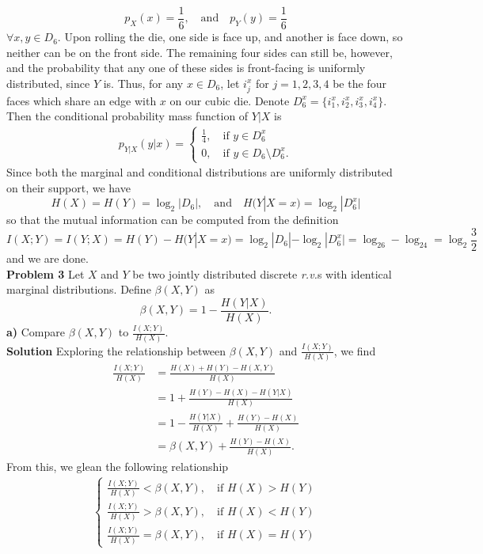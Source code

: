 \documentclass[11pt, letterpaper]{article}
\begin{document}
\[p_X(x)=\frac{1}{6},\quad\text{and}\quad p_Y(y)=\frac{1}{6}\]
$\forall x,y\in D_6$. Upon rolling the die, one side is face up, and another is face down, so neither can be on the front side. The remaining four sides can still be, however, and
the probability that any one of these sides is front-facing is uniformly distributed, since $Y$ is. Thus, for any $x\in D_6$, let $i_j^x$ for $j=1,2,3,4$ be the four faces which share an edge with
$x$ on our cubic die. Denote $D_6^x=\{i^x_1,i^x_2,i^x_3,i^x_4\}$. Then the conditional probability mass function of $Y|X$ is
\begin{align*}
    p_{Y|X}(y|x)=\begin{cases}
        \frac{1}{4},\quad\text{if $y\in D_6^x$}\\
        0,\quad\text{if $y\in D_6\setminus D_6^x$}.
    \end{cases}
\end{align*}
Since both the marginal and conditional distributions are uniformly distributed on their support, we have
\[H(X)=H(Y)=\log_2|D_6|,\quad\text{and}\quad H(Y|X=x)=\log_2|D_6^x|\tag{Lemma 2.6}\]
so that the mutual information can be computed from the definition
\[I(X;Y)=I(Y;X)=H(Y)-H(Y|X=x)=\log_2|D_6|-\log_2|D_6^x|=\log_26-\log_24=\log_2\frac{3}{2}\]
and we are done.\\[10pt]
{\bf Problem 3} Let $X$ and $Y$ be two jointly distributed discrete {\it r.v.}s with identical marginal distributions.
Define $\beta(X,Y)$ as
\[\beta(X,Y)=1-\frac{H(Y|X)}{H(X)}.\]
{\bf a)} Compare $\beta(X,Y)$ to $\frac{I(X;Y)}{H(X)}$.\\[10pt]
{\bf Solution} Exploring the relationship between $\beta(X,Y)$ and $\frac{I(X;Y)}{H(X)}$, we find
\begin{align*}
    \frac{I(X;Y)}{H(X)}&=\frac{H(X)+H(Y)-H(X,Y)}{H(X)}\\
    &=1+\frac{H(Y)-H(X)-H(Y|X)}{H(X)}\tag{expanding $H(X,Y)=H(X)+H(Y|X)$}\\
    &=1-\frac{H(Y|X)}{H(X)}+\frac{H(Y)-H(X)}{H(X)}\\
    &=\beta(X,Y)+\frac{H(Y)-H(X)}{H(X)}.\tag{1}
\end{align*}
From this, we glean the following relationship
\begin{align*}
    \begin{cases}
        \frac{I(X;Y)}{H(X)}<\beta(X,Y),\quad\text{if $H(X)>H(Y)$}\\[5pt]
        \frac{I(X;Y)}{H(X)}>\beta(X,Y),\quad\text{if $H(X)<H(Y)$}\\[5pt]
        \frac{I(X;Y)}{H(X)}=\beta(X,Y),\quad\text{if $H(X)=H(Y)$}
    \end{cases}\tag{2}
\end{align*}
\end{document}
